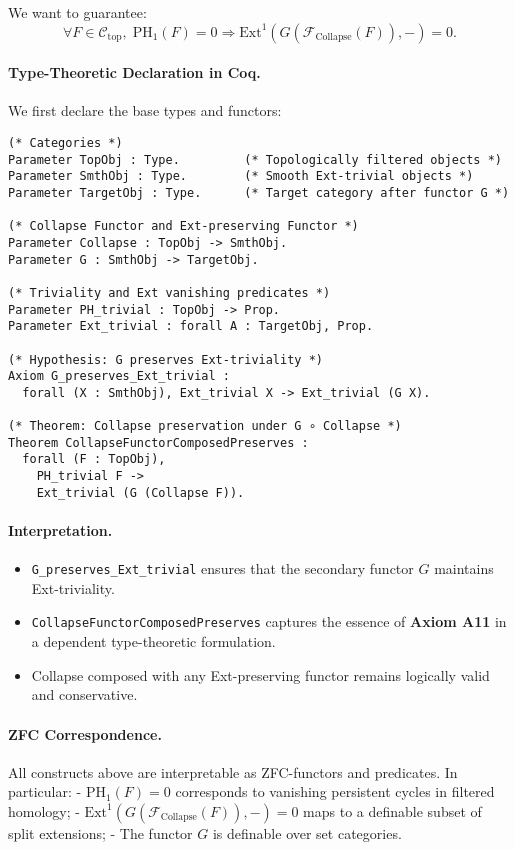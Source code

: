 \documentclass[11pt]{article}
\begin{document}
We want to guarantee:
\[
\forall F \in \mathcal{C}_{\mathrm{top}},\;
\mathrm{PH}_1(F) = 0 \Rightarrow \mathrm{Ext}^1(G(\mathcal{F}_{\mathrm{Collapse}}(F)), -) = 0.
\]

\paragraph{Type-Theoretic Declaration in Coq.}

We first declare the base types and functors:

\begin{lstlisting}[language=Coq]
(* Categories *)
Parameter TopObj : Type.         (* Topologically filtered objects *)
Parameter SmthObj : Type.        (* Smooth Ext-trivial objects *)
Parameter TargetObj : Type.      (* Target category after functor G *)

(* Collapse Functor and Ext-preserving Functor *)
Parameter Collapse : TopObj -> SmthObj.
Parameter G : SmthObj -> TargetObj.

(* Triviality and Ext vanishing predicates *)
Parameter PH_trivial : TopObj -> Prop.
Parameter Ext_trivial : forall A : TargetObj, Prop.

(* Hypothesis: G preserves Ext-triviality *)
Axiom G_preserves_Ext_trivial :
  forall (X : SmthObj), Ext_trivial X -> Ext_trivial (G X).

(* Theorem: Collapse preservation under G ∘ Collapse *)
Theorem CollapseFunctorComposedPreserves :
  forall (F : TopObj),
    PH_trivial F ->
    Ext_trivial (G (Collapse F)).
\end{lstlisting}

\paragraph{Interpretation.}
\begin{itemize}
  \item \texttt{G\_preserves\_Ext\_trivial} ensures that the secondary functor \( G \) maintains Ext-triviality.
  \item \texttt{CollapseFunctorComposedPreserves} captures the essence of \textbf{Axiom A11} in a dependent type-theoretic formulation.
  \item Collapse composed with any Ext-preserving functor remains logically valid and conservative.
\end{itemize}


\paragraph{ZFC Correspondence.}
All constructs above are interpretable as ZFC-functors and predicates.  
In particular:
- \( \mathrm{PH}_1(F) = 0 \) corresponds to vanishing persistent cycles in filtered homology;
- \( \mathrm{Ext}^1(G(\mathcal{F}_{\mathrm{Collapse}}(F)), -) = 0 \) maps to a definable subset of split extensions;
- The functor \( G \) is definable over set categories.
\end{document}

